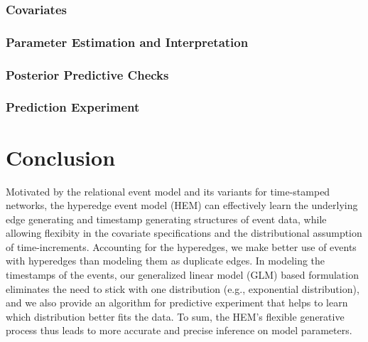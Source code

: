 \documentclass[12pt]{article}
\begin{document}
\subsubsection{Covariates}\label{subsec:Covariates_sanction}
\subsubsection{Parameter Estimation and Interpretation}\label{subsubsec:Result_sanction}
	\subsubsection{Posterior Predictive Checks}\label{subsubsec:PPC_sanction} 	 
		\subsubsection{Prediction Experiment}\label{subsubsec:Experiment_sanction} 
		\fi 
\section{Conclusion}\label{sec:conclusion}
Motivated by the relational event model \citep{Butts2008} and its variants for time-stamped networks, the hyperedge event model (HEM) can effectively learn the underlying edge generating and timestamp generating structures of event data, while allowing flexibity in the covariate specifications and the distributional assumption of time-increments.
Accounting for the hyperedges, we make better use of events with hyperedges than modeling them as duplicate edges. In modeling the timestamps of the events, our generalized linear model (GLM) based formulation eliminates the need to stick with one distribution (e.g., exponential distribution), and we also provide an algorithm for predictive experiment that helps to learn which distribution better fits the data. To sum, the HEM's flexible generative process thus leads to more accurate and precise inference on model parameters.
\end{document}

